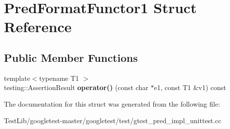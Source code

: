 \hypertarget{structPredFormatFunctor1}{}\section{Pred\+Format\+Functor1 Struct Reference}
\label{structPredFormatFunctor1}
\subsection*{Public Member Functions}
\begin{DoxyCompactItemize}
\item 
\mbox{\label{structPredFormatFunctor1_ac2c414b5fa65b41b0ab5967f9f1e5bff}} 
{\footnotesize template$<$typename T1 $>$ }\\testing\+::\+Assertion\+Result {\bfseries operator()} (const char $\ast$e1, const T1 \&v1) const
\end{DoxyCompactItemize}


The documentation for this struct was generated from the following file\+:\begin{DoxyCompactItemize}
\item 
Test\+Lib/googletest-\/master/googletest/test/gtest\+\_\+pred\+\_\+impl\+\_\+unittest.\+cc\end{DoxyCompactItemize}
